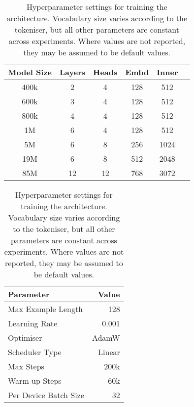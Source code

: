 \begin{table}[t]
    \begin{minipage}{.5\linewidth}
        \centering
        \small
        \begin{tabular}{cccccc}
            \toprule
            Model Size & Layers & Heads & Embd & Inner \\
            \midrule
            400k & 2 & 4 & 128 & 512 \\ 
            600k & 3 & 4 & 128 & 512 \\ 
            800k & 4 & 4 & 128 & 512 \\ 
            1M & 6 & 4 & 128 & 512 \\ 
            5M & 6 & 8 & 256 & 1024 \\ 
            19M & 6 & 8 & 512 & 2048 \\ 
            85M & 12 & 12 & 768 & 3072 \\ 
            \bottomrule
        \end{tabular}
        \caption{Parameters for \gpt model of varying sizes. Where values are not reported, they may be assumed to be default values.}
        \label{tab:14-model_sizes}
    \end{minipage}
    \hfill
    \begin{minipage}{.45\linewidth}
        \centering
        \small
        \begin{tabular}{lr}
            \toprule
            Parameter & Value \\
            \midrule
            Max Example Length & 128 \\
            Learning Rate & 0.001\\
            Optimiser & AdamW \\
            Scheduler Type & Linear\\
            Max Steps & 200k \\
            Warm-up Steps & 60k \\
            Per Device Batch Size & 32 \\
            \bottomrule
        \end{tabular}
        \caption{Hyperparameter settings for training the \gpt architecture. Vocabulary size varies according to the tokeniser, but all other parameters are constant across experiments. Where values are not reported, they may be assumed to be default values.}
        \label{tab:14-trainingparams}
    \end{minipage}
\end{table}

